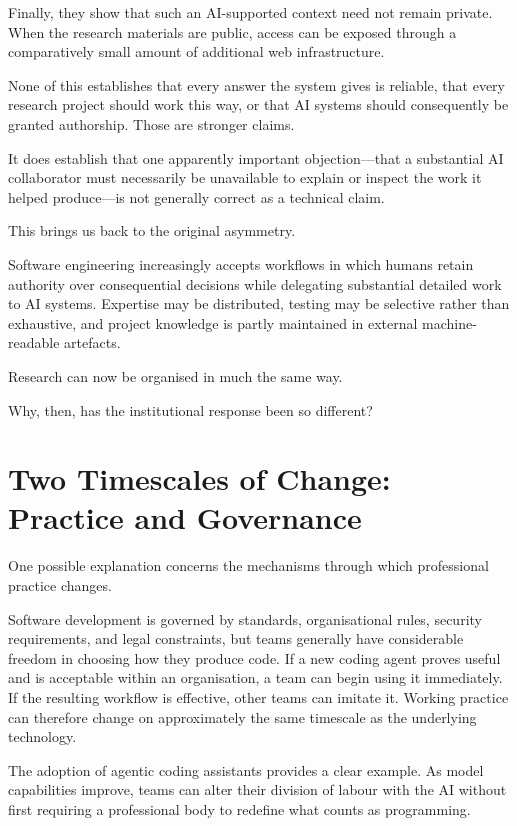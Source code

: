 Finally, they show that such an AI-supported context need not remain private. When the research materials are public, access can be exposed through a comparatively small amount of additional web infrastructure.

None of this establishes that every answer the system gives is reliable, that every research project should work this way, or that AI systems should consequently be granted authorship. Those are stronger claims.

It does establish that one apparently important objection---that a substantial AI collaborator must necessarily be unavailable to explain or inspect the work it helped produce---is not generally correct as a technical claim.

This brings us back to the original asymmetry.

Software engineering increasingly accepts workflows in which humans retain authority over consequential decisions while delegating substantial detailed work to AI systems. Expertise may be distributed, testing may be selective rather than exhaustive, and project knowledge is partly maintained in external machine-readable artefacts.

Research can now be organised in much the same way.

Why, then, has the institutional response been so different?


\section{Two Timescales of Change: Practice and Governance}

One possible explanation concerns the mechanisms through which professional practice changes.

Software development is governed by standards, organisational rules, security requirements, and legal constraints, but teams generally have considerable freedom in choosing how they produce code. If a new coding agent proves useful and is acceptable within an organisation, a team can begin using it immediately. If the resulting workflow is effective, other teams can imitate it. Working practice can therefore change on approximately the same timescale as the underlying technology.

The adoption of agentic coding assistants provides a clear example. As model capabilities improve, teams can alter their division of labour with the AI without first requiring a professional body to redefine what counts as programming.

